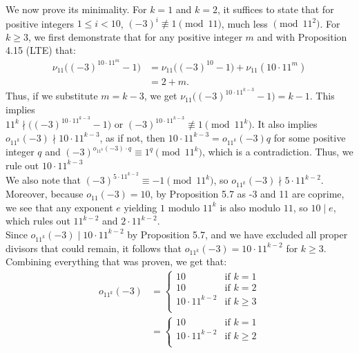 \documentclass{article}
\begin{document}
\begin{enumerate}[leftmargin=*, label=\arabic*.]
\begin{enumerate}[label=\alph*)]
    We now prove its minimality. For $k = 1$ and $k = 2$, it suffices to state that for positive integers $1 \leq i < 10$, $(-3)^i \not\equiv 1 \pmod{11}$, much less $\pmod{11^2}$. For $k \geq 3$, we first demonstrate that for any positive integer $m$ and with Proposition 4.15 (LTE) that: 
    \begin{align*}
    \nu_{11}\big((-3)^{10\cdot 11^m} - 1\big) &= \nu_{11}\big((-3)^{10} - 1\big) + \nu_{11}(10 \cdot 11^m) \\
    &= 2 + m.
    \end{align*}
    Thus, if we substitute $m = k - 3$, we get $\nu_{11}\big((-3)^{10\cdot 11^{k-3}} - 1\big) = k - 1$. This implies \\ $11^k \nmid \big((-3)^{10\cdot 11^{k-3}} - 1\big)$ or $(-3)^{10\cdot 11^{k-3}} \not\equiv 1 \pmod{11^k}$. It also implies $o_{11^k}(-3) \nmid 10\cdot 11^{k-3}$, as if not, then $10\cdot 11^{k-3} = o_{11^k}(-3)q$ for some positive integer $q$ and $(-3)^{o_{11^k}(-3)\cdot q} \equiv 1^q \pmod{11^k}$, which is a contradiction. Thus, we rule out $10\cdot 11^{k-3}$\\
    
    We also note that $(-3)^{5\cdot11^{k-2}} \equiv -1 \pmod {11^k}$, so $o_{11^k}(-3) \nmid 5\cdot 11^{k-2}$. Moreover, because $o_{11}(-3)=10$, by Proposition 5.7 as -3 and 11 are coprime, we see that any exponent $e$ yielding $1$ modulo $11^k$ is also modulo $11$, so $10 \mid e$, which rules out $11^{k-2}$ and $2\cdot 11^{k-2}$. \\
    
    Since $o_{11^k}(-3) \mid 10\cdot 11^{k-2}$ by Proposition 5.7, and we have excluded all proper divisors that could remain, it follows that $o_{11^k}(-3) = 10\cdot 11^{k-2}$ for $k \geq 3$. \\
    
    Combining everything that was proven, we get that: 
    \begin{align*}
    o_{11^k}(-3) &=
    \begin{cases}
      10 & \text{if } k = 1 \\
      10 & \text{if } k = 2 \\
      10 \cdot 11^{k-2} & \text{if } k \geq 3 \\
    \end{cases} \\
    &= \begin{cases}
  10 & \text{if } k = 1 \\
  10 \cdot 11^{k-2} & \text{if } k \geq 2 \\
    \end{cases}
    \end{align*}
    

\end{enumerate}
\end{enumerate}
\end{document}
